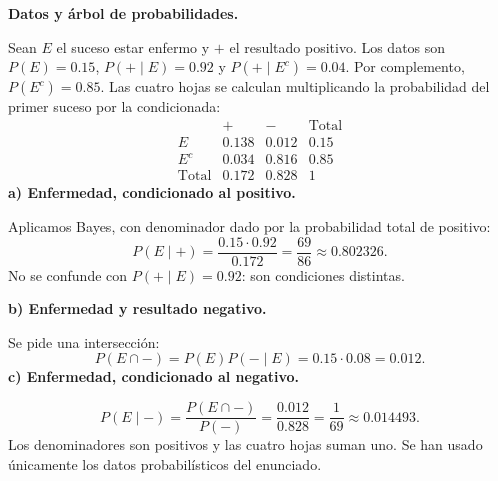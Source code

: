 \textbf{Datos y árbol de probabilidades.}\par\nopagebreak[4]
Sean $E$ el suceso estar enfermo y $+$ el resultado positivo. Los datos son $P(E)=0.15$, $P(+\mid E)=0.92$ y $P(+\mid E^c)=0.04$. Por complemento, $P(E^c)=0.85$.
Las cuatro hojas se calculan multiplicando la probabilidad del primer suceso por la condicionada:
\[
\begin{array}{c|rr|r}
&+&- &\text{Total}\\\hline
E&0.138&0.012&0.15\\
E^c&0.034&0.816&0.85\\\hline
\text{Total}&0.172&0.828&1
\end{array}
\]
\textbf{a) Enfermedad, condicionado al positivo.}\par\nopagebreak[4]
Aplicamos Bayes, con denominador dado por la probabilidad total de positivo:
\[
\boxed{P(E\mid+)=\frac{0.15\cdot0.92}{0.172}
=\frac{69}{86}\approx0.802326.}
\]
No se confunde con $P(+\mid E)=0.92$: son condiciones distintas.

\textbf{b) Enfermedad y resultado negativo.}\par\nopagebreak[4]
Se pide una intersección:
\[
\boxed{P(E\cap-)=P(E)P(-\mid E)=0.15\cdot0.08=0.012.}
\]
\textbf{c) Enfermedad, condicionado al negativo.}\par\nopagebreak[4]
\[
\boxed{P(E\mid-)=\frac{P(E\cap-)}{P(-)}
=\frac{0.012}{0.828}=\frac1{69}\approx0.014493.}
\]
Los denominadores son positivos y las cuatro hojas suman uno. Se han usado únicamente los datos probabilísticos del enunciado.
